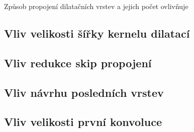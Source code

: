 Způsob propojení dilatačních vrstev a jejich počet ovlivňuje 

\subsection{Vliv velikosti šířky kernelu dilatací}

\subsection{Vliv redukce skip propojení}

\subsection{Vliv návrhu posledních vrstev}

\subsection{Vliv velikosti první konvoluce}
